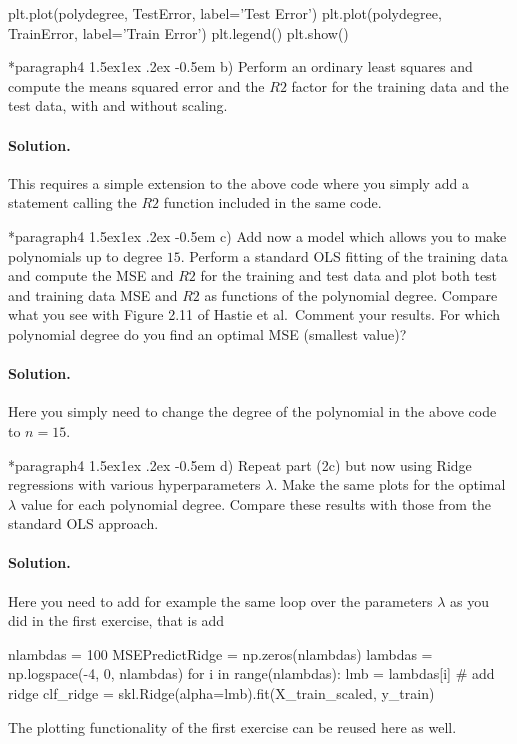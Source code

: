 \documentclass[%
oneside,                 %
final,                   %
10pt]{article}
\makeatletter
\newenvironment{doconceexercise}{}{}
\newcommand\subex{\@startsection*{paragraph}{4}{\z@}%
                  {1.5ex\@plus1ex \@minus.2ex}%
                  {-0.5em}%
                  {\normalfont\normalsize\bfseries}}
\makeatother
\begin{document}
\begin{doconceexercise}
\begin{print}
plt.plot(polydegree, TestError, label='Test Error')
plt.plot(polydegree, TrainError, label='Train Error')
plt.legend()
plt.show()
\end{print}


\subex{b)}
Perform an ordinary least squares and compute the means squared error and the $R2$ factor for the training data and the test data, with and without scaling.


\paragraph{Solution.}
This requires a simple extension to the above code where you simply add a statement calling the $R2$ function included in the same code.


\subex{c)}
Add now a model which allows you to make polynomials up to degree $15$.  Perform a standard OLS fitting of the training data and compute the MSE and $R2$ for the training and test data and plot both test and training data MSE and $R2$ as functions of the polynomial degree. Compare what you see with Figure 2.11 of Hastie et al.~Comment your results. For which polynomial degree do you find an optimal MSE (smallest value)?


\paragraph{Solution.}
Here you simply need to change the degree of the polynomial in the above code to $n=15$.


\subex{d)}
Repeat part (2c) but now using Ridge regressions with various hyperparameters $\lambda$. Make the same plots for the optimal $\lambda$ value for each polynomial degree. Compare these results with those from the standard OLS approach.


\paragraph{Solution.}
Here you need to add for example the same loop over the parameters $\lambda$ as you did in the first exercise, that is add
\begin{print}
nlambdas = 100
MSEPredictRidge = np.zeros(nlambdas)
lambdas = np.logspace(-4, 0, nlambdas)
for i in range(nlambdas):
    lmb = lambdas[i]
    # add ridge
    clf_ridge = skl.Ridge(alpha=lmb).fit(X_train_scaled, y_train)

\end{print}
The plotting functionality of the first exercise can be reused here as well.






\end{doconceexercise}


\end{document}
